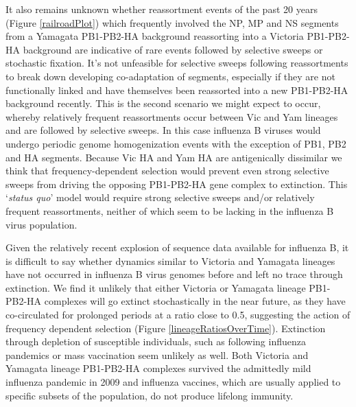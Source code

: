 \documentclass[11pt,oneside,letterpaper]{article}
\begin{document}
It also remains unknown whether reassortment events of the past 20 years (Figure \ref{railroadPlot}) which frequently involved the NP, MP and NS segments from a Yamagata PB1-PB2-HA background reassorting into a Victoria PB1-PB2-HA background are indicative of rare events followed by selective sweeps or stochastic fixation.
It's not unfeasible for selective sweeps following reassortments to break down developing co-adaptation of segments, especially if they are not functionally linked and have themselves been reassorted into a new PB1-PB2-HA background recently.
This is the second scenario we might expect to occur, whereby relatively frequent reassortments occur between Vic and Yam lineages and are followed by selective sweeps.
In this case influenza B viruses would undergo periodic genome homogenization events with the exception of PB1, PB2 and HA segments.
Because Vic HA and Yam HA are antigenically dissimilar we think that frequency-dependent selection would prevent even strong selective sweeps from driving the opposing PB1-PB2-HA gene complex to extinction.
This `\textit{status quo}' model would require strong selective sweeps and/or relatively frequent reassortments, neither of which seem to be lacking in the influenza B virus population.

Given the relatively recent explosion of sequence data available for influenza B, it is difficult to say whether dynamics similar to Victoria and Yamagata lineages have not occurred in influenza B virus genomes before and left no trace through extinction.
We find it unlikely that either Victoria or Yamagata lineage PB1-PB2-HA complexes will go extinct stochastically in the near future, as they have co-circulated for prolonged periods at a ratio close to 0.5, suggesting the action of frequency dependent selection (Figure \ref{lineageRatiosOverTime}).
Extinction through depletion of susceptible individuals, such as following influenza pandemics or mass vaccination seem unlikely as well.
Both Victoria and Yamagata lineage PB1-PB2-HA complexes survived the admittedly mild influenza pandemic in 2009 and influenza vaccines, which are usually applied to specific subsets of the population, do not produce lifelong immunity.
\end{document}
